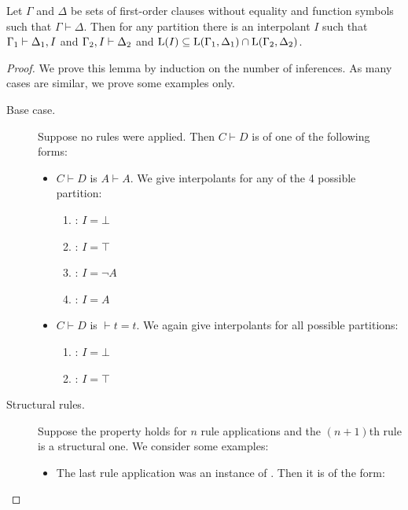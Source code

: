 \begin{lemma}[Maehara]
	\label{lemma:maehara}
Let $\Gamma$ and $\Delta$ be sets of first-order clauses without equality and function symbols such that $\Gamma \vdash \Delta$.
	Then for any partition 
	there is an interpolant $I$ such that $\Gamma_1 \vdash \Delta_1, I$ and $\Gamma_2, I \vdash \Delta_2$ and $\operatorname{L}(I) \subseteq \operatorname{L}(\Gamma_1, \Delta_1) \cap \operatorname{L}(\Gamma_2, \Delta_2)$.
\end{lemma}
\begin{proof}
	We prove this lemma by induction on the number of inferences.
	As many cases are similar, we prove some examples only.

	\begin{description}
		\item[\normalfont Base case.]
			Suppose no rules were applied.
			Then $C \vdash D$ is of one of the following forms:
			\begin{itemize}
				\item $C \vdash D$ is $A \vdash A$. We give interpolants for any of the 4 possible partition:
					\begin{enumerate}
						\item {}: $I=\bot$
						\item {}: $I=\top$
						\item {}: $I=\lnot A$
						\item {}: $I=A$
					\end{enumerate}
				\item $C \vdash D$ is $\vdash t=t$. We again give interpolants for all possible partitions:
					\begin{enumerate}
						\item {}: $I=\bot$
						\item {}: $I=\top$
					\end{enumerate}
			\end{itemize}

		\item[\normalfont Structural rules.]
			Suppose the property holds for $n$ rule applications and the $(n+1)$th rule is a structural one.
			We consider some examples:

			\begin{itemize}
				\item The last rule application was an instance of . Then it is of the form:
					\begin{prooftree}
					\end{prooftree}


\end{itemize}
\end{description}
\end{proof}
